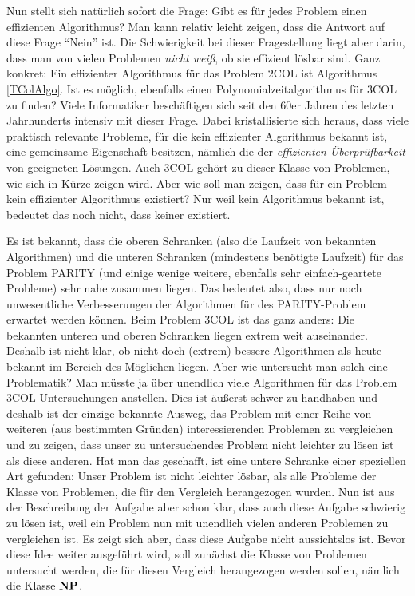 Nun stellt sich natürlich sofort die Frage: Gibt es für jedes Problem
einen effizienten Algorithmus?  Man kann relativ leicht zeigen, dass
die Antwort auf diese Frage "`Nein"' ist. Die Schwierigkeit bei dieser
Fragestellung liegt aber darin, dass man von vielen Problemen
\emph{nicht weiß}, ob sie effizient lösbar sind.  Ganz konkret: Ein
effizienter Algorithmus für das Problem $2\mathrm{COL}$ ist
Algorithmus
\ref{TColAlgo}. Ist es möglich, ebenfalls einen
Polynomialzeitalgorithmus für $3\mathrm{COL}$ zu finden? Viele Informatiker
beschäftigen sich seit den 60er Jahren des letzten Jahrhunderts
intensiv mit dieser Frage. Dabei kristallisierte sich heraus, dass
viele praktisch relevante Probleme, für die kein effizienter
Algorithmus bekannt ist, eine gemeinsame Eigenschaft besitzen, nämlich
die der \emph{effizienten Überprüfbarkeit} von geeigneten
Lösungen. Auch $3\mathrm{COL}$ gehört zu dieser Klasse von Problemen, wie sich
in Kürze zeigen wird. Aber wie soll man zeigen, dass für ein Problem
kein effizienter Algorithmus existiert?  Nur weil kein Algorithmus
bekannt ist, bedeutet das noch nicht, dass keiner existiert.

Es ist bekannt, dass die oberen Schranken (also die Laufzeit von
bekannten Algorithmen) und die unteren Schranken (mindestens benötigte
Laufzeit) für das Problem PARITY (und einige wenige weitere, ebenfalls
sehr einfach-geartete Probleme) sehr nahe zusammen liegen. Das
bedeutet also, dass nur noch unwesentliche Verbesserungen der
Algorithmen für des PARITY-Problem erwartet werden können. Beim
Problem $3\mathrm{COL}$ ist das ganz anders: Die bekannten unteren
und oberen Schranken liegen extrem weit auseinander. Deshalb ist nicht
klar, ob nicht doch (extrem) bessere Algorithmen als heute bekannt im
Bereich des Möglichen liegen. Aber wie untersucht man solch eine
Problematik?  Man müsste ja über unendlich viele Algorithmen für das
Problem $3\mathrm{COL}$ Untersuchungen anstellen. Dies ist äußerst
schwer zu handhaben und deshalb ist der einzige bekannte Ausweg, das
Problem mit einer Reihe von weiteren (aus bestimmten Gründen)
interessierenden Problemen zu vergleichen und zu zeigen, dass unser zu
untersuchendes Problem nicht leichter zu lösen ist als diese
anderen. Hat man das geschafft, ist eine untere Schranke einer
speziellen Art gefunden: Unser Problem ist nicht leichter lösbar, als
alle Probleme der Klasse von Problemen, die für den Vergleich
herangezogen wurden. Nun ist aus der Beschreibung der Aufgabe aber
schon klar, dass auch diese Aufgabe schwierig zu lösen ist, weil ein
Problem nun mit unendlich vielen anderen Problemen zu vergleichen
ist. Es zeigt sich aber, dass diese Aufgabe nicht aussichtslos
ist. Bevor diese Idee weiter ausgeführt wird, soll zunächst die Klasse
von Problemen untersucht werden, die für diesen Vergleich herangezogen
werden sollen, nämlich die Klasse $\mathbf{N}\mathbf{P}$.

